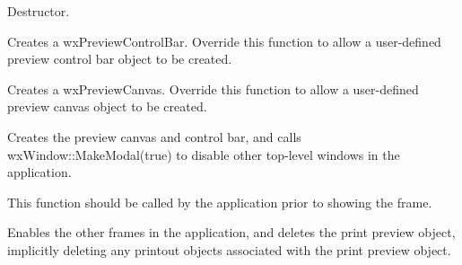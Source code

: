 \label{wxpreviewframedtor}


Destructor. 

\label{wxpreviewframecreatecontrolbar}


Creates a wxPreviewControlBar. Override this function to allow
a user-defined preview control bar object to be created.

\label{wxpreviewframecreatecanvas}


Creates a wxPreviewCanvas. Override this function to allow
a user-defined preview canvas object to be created.

\label{wxpreviewframeinitialize}


Creates the preview canvas and control bar, and calls
wxWindow::MakeModal(true) to disable other top-level windows
in the application.

This function should be called by the application prior to
showing the frame.

\label{wxpreviewframeonclosewindow}


Enables the other frames in the application, and deletes the print preview
object, implicitly deleting any printout objects associated with the print
preview object.

